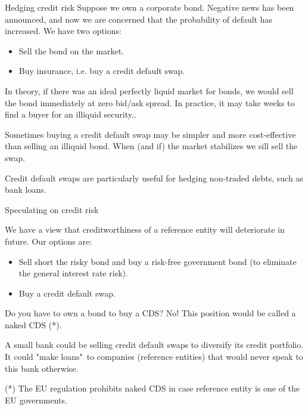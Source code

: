 \documentclass{beamer}
\begin{document}
\begin{frame}{Hedging credit risk}
\justify
Suppose we own a corporate bond. Negative news has been announced, and now we are concerned that the probability of default has increased. We have two options:
\begin{itemize}
\item Sell the bond on the market.
\item Buy insurance, i.e. buy a credit default swap.
\end{itemize}

\justify
In theory, if there was an ideal perfectly liquid market for bonds, we would sell the bond immediately at zero bid/ask spread. In practice, it may take weeks to find a buyer for an illiquid security..

\justify
Sometimes buying a credit default swap may be simpler and more cost-effective than selling an illiquid bond. When (and if) the market stabilizes we sill sell the swap.

\justify
Credit default swaps are particularly useful for hedging non-traded debts, such as bank loans.
\end{frame}



\begin{frame}{Speculating on credit risk}

\justify
We have a view that creditworthiness of a reference entity will deteriorate in future. Our options are:
\begin{itemize}
\justifying
\item Sell short the risky bond and buy a risk-free government bond (to eliminate the general interest rate risk).
\item Buy a credit default swap.
\end{itemize}

\justify
Do you have to own a bond  to buy a CDS? No! This position would be called a naked CDS (*).

\justify
A small bank could be selling credit default swaps to diversify its credit portfolio. It could "make loans"\ to companies (reference entities) that would never speak to this bank otherwise.

\justify
(*) The EU regulation prohibits naked CDS in case reference entity is one of the EU governments.
\end{frame}


\renewcommand{\swapPartyNode}[4]{

	\draw (#1, #2)
		node[
			rectangle,
			draw,
			rounded corners,
			anchor = south,
			minimum height = 0.8cm,
			minimum width = 2.8cm
		]
		(#4)
		{#3};
}
\end{document}
